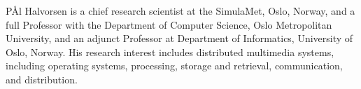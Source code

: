 \documentclass[journal]{IEEEtran}
\begin{document}
\begin{IEEEbiography}{P{\AA}l Halvorsen} is a chief research scientist at the SimulaMet, Oslo, Norway, and a full Professor with the Department of Computer Science, Oslo Metropolitan University, and an adjunct Professor at Department of Informatics, University of Oslo, Norway. His research interest includes distributed multimedia systems, including operating systems, processing, storage and retrieval, communication, and distribution.
\end{IEEEbiography}








 
\end{document}
